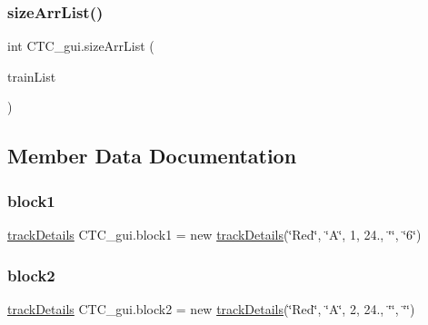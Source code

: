 \subsubsection{\texorpdfstring{size\+Arr\+List()}{sizeArrList()}}
{\footnotesize\ttfamily int C\+T\+C\+\_\+gui.\+size\+Arr\+List (\begin{DoxyParamCaption}\item[{Array\+List$<$ \hyperlink{classtrain}{train} $>$}]{train\+List }\end{DoxyParamCaption})}



\subsection{Member Data Documentation}
\mbox{\label{classCTC__gui_a9f323c3477f61193b3e87c047eed84a7}} 
\subsubsection{\texorpdfstring{block1}{block1}}
{\footnotesize\ttfamily \hyperlink{classtrackDetails}{track\+Details} C\+T\+C\+\_\+gui.\+block1 = new \hyperlink{classtrackDetails}{track\+Details}(\char`\"{}Red\char`\"{}, \char`\"{}A\char`\"{}, 1, 24., \char`\"{}\char`\"{}, \char`\"{}6\char`\"{})\hspace{0.3cm}{\ttfamily [private]}}

\mbox{\label{classCTC__gui_af19fcf01d102c99e349cba43ac13a3a3}} 
\subsubsection{\texorpdfstring{block2}{block2}}
{\footnotesize\ttfamily \hyperlink{classtrackDetails}{track\+Details} C\+T\+C\+\_\+gui.\+block2 = new \hyperlink{classtrackDetails}{track\+Details}(\char`\"{}Red\char`\"{}, \char`\"{}A\char`\"{}, 2, 24., \char`\"{}\char`\"{}, \char`\"{}\char`\"{})\hspace{0.3cm}{\ttfamily [private]}}

\mbox{\label{classCTC__gui_ac0d6e738f3b1462abd7b962bd58d82ea}} 
